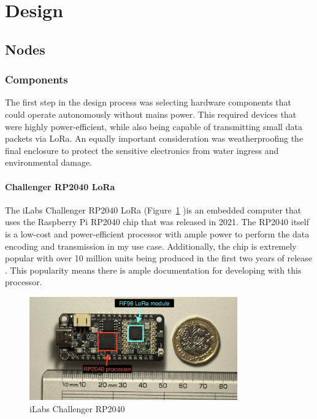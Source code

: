 \section{Design}

\subsection{Nodes}

\subsubsection{Components}

The first step in the design process was selecting hardware components that
could operate autonomously without mains power. This required devices that were
highly power-efficient, while also being capable of transmitting small data
packets via LoRa. An equally important consideration was weatherproofing the
final enclosure to protect the sensitive electronics from water ingress and
environmental damage.

\paragraph{Challenger RP2040 LoRa}

The iLabs Challenger RP2040 LoRa (Figure~\ref{fig:challenger-rp2040} )is an
embedded computer that uses the Raspberry Pi RP2040 chip that was released in
2021. The RP2040 itself is a low-cost and power-efficient processor with ample
power to perform the data encoding and transmission in my use case.
Additionally, the chip is extremely popular with over 10 million units being
produced in the first two years of release \cite{pounder2023}. This popularity
means there is ample documentation for developing with this processor.

\begin{figure}[H]
    \centering
    \includegraphics[width=0.8\textwidth]{contents/part-2/fig2/challenger-rp2040.jpg}
    \caption{iLabs Challenger RP2040}
    \label{fig:challenger-rp2040}
\end{figure}

